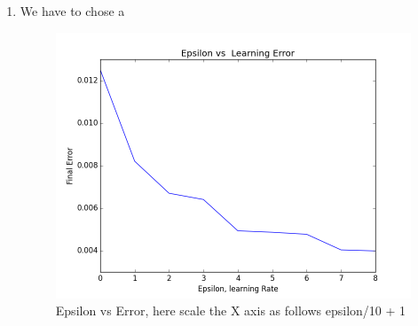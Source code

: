 \documentclass[10pt, letterpaper]{article}
\begin{document}
\begin{enumerate}
\item We have to chose a 
\begin{figure}[h!]
\centering
\includegraphics[scale=0.75]{EpsilonvsError.png}
\caption{Epsilon vs Error, here scale the X axis as follows  epsilon/10 + 1}
\label{fig:Epsilon}
\end{figure}


\end{enumerate}
\end{document}
